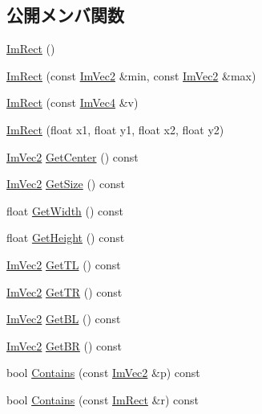 \subsection*{公開メンバ関数}
\begin{DoxyCompactItemize}
\item 
\mbox{\hyperlink{struct_im_rect_a57399f36758ed3eb1eb762143401ff54}{Im\+Rect}} ()
\item 
\mbox{\hyperlink{struct_im_rect_a2f0ff273434bfd9d22bb699fd7a63a1f}{Im\+Rect}} (const \mbox{\hyperlink{struct_im_vec2}{Im\+Vec2}} \&min, const \mbox{\hyperlink{struct_im_vec2}{Im\+Vec2}} \&max)
\item 
\mbox{\hyperlink{struct_im_rect_adfe8d43381f9af8a3e3ea32a3821ab84}{Im\+Rect}} (const \mbox{\hyperlink{struct_im_vec4}{Im\+Vec4}} \&v)
\item 
\mbox{\hyperlink{struct_im_rect_a4cd168f1ae088e15db64b95b880f8933}{Im\+Rect}} (float x1, float y1, float x2, float y2)
\item 
\mbox{\hyperlink{struct_im_vec2}{Im\+Vec2}} \mbox{\hyperlink{struct_im_rect_aae13f8003184fd84f29d27c3c074cf43}{Get\+Center}} () const
\item 
\mbox{\hyperlink{struct_im_vec2}{Im\+Vec2}} \mbox{\hyperlink{struct_im_rect_ae459d9c50003058cfb34519a571aaf33}{Get\+Size}} () const
\item 
float \mbox{\hyperlink{struct_im_rect_afa75cb8491f20901c96166d17dcddac4}{Get\+Width}} () const
\item 
float \mbox{\hyperlink{struct_im_rect_a748d8ae9cb26508951ec6e2f2df0625b}{Get\+Height}} () const
\item 
\mbox{\hyperlink{struct_im_vec2}{Im\+Vec2}} \mbox{\hyperlink{struct_im_rect_a1d4d972329722b51dca4499cb5931b4b}{Get\+TL}} () const
\item 
\mbox{\hyperlink{struct_im_vec2}{Im\+Vec2}} \mbox{\hyperlink{struct_im_rect_acae90248a96be4acf1524071fca1c3f3}{Get\+TR}} () const
\item 
\mbox{\hyperlink{struct_im_vec2}{Im\+Vec2}} \mbox{\hyperlink{struct_im_rect_a59d9751bc7be6745dddf5b83b9155669}{Get\+BL}} () const
\item 
\mbox{\hyperlink{struct_im_vec2}{Im\+Vec2}} \mbox{\hyperlink{struct_im_rect_ad2f2687254beed5a9b19bde0d6fa14f5}{Get\+BR}} () const
\item 
bool \mbox{\hyperlink{struct_im_rect_ac583156fd0e9306181fff5d120b262ea}{Contains}} (const \mbox{\hyperlink{struct_im_vec2}{Im\+Vec2}} \&p) const
\item 
bool \mbox{\hyperlink{struct_im_rect_ad6043344d8ac30d5f342c71641cfe24b}{Contains}} (const \mbox{\hyperlink{struct_im_rect}{Im\+Rect}} \&r) const

\end{DoxyCompactItemize}
